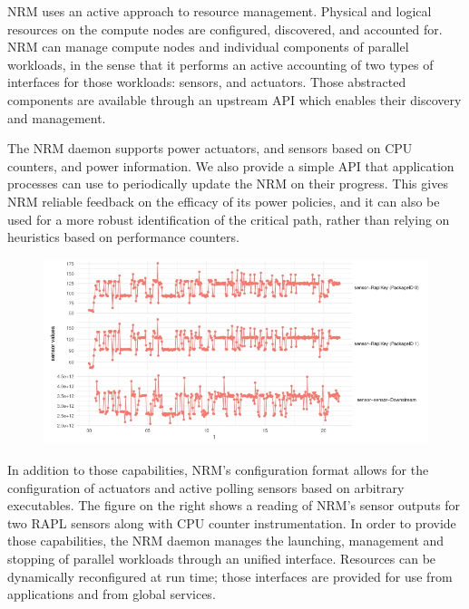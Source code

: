 NRM uses an active approach to resource management. Physical and logical
resources on the compute nodes are configured, discovered, and accounted for.
NRM can manage compute nodes and individual components of parallel workloads,
in the sense that it performs an active accounting of two types of interfaces
for those workloads: sensors, and actuators. Those abstracted components are
available through an upstream API which enables their discovery and management.

The NRM daemon supports power actuators, and sensors based on CPU counters,
and power information. We also provide a simple API that application processes
can use to periodically update the NRM on their progress. This gives NRM
reliable feedback on the efficacy of its power policies, and it can also
be used for a more robust identification of the critical path, rather than
relying on heuristics based on performance counters.

\begin{figure}
  \includegraphics[width=.58\textwidth]{projects/2.3.1-PMR/2.3.1.19-Argo-PowerSteering/sensors}
\end{figure}
In addition to those capabilities, NRM's configuration format allows for
the configuration of actuators and active polling sensors based on arbitrary
executables. The figure on the right shows a reading of NRM's sensor
outputs for two RAPL sensors along with CPU counter instrumentation. In order
to provide those capabilities, the NRM daemon manages the launching, management
and stopping of parallel workloads through an unified interface. Resources
can be dynamically reconfigured at run time; those interfaces are provided
for use from applications and from global services.


